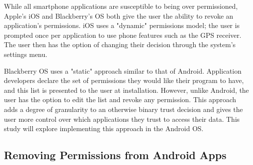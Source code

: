 While all smartphone applications are susceptible to being over permissioned, Apple's iOS and Blackberry's OS both give the user the ability to revoke an application’s permissions.  iOS uses a "dynamic" permissions model; the user is prompted once per application to use phone features such as the GPS receiver.  The user then has the option of changing their decision through the system's settings menu.  

Blackberry OS uses a "static" approach similar to that of Android.  Application developers declare the set of permissions they would like their program to have, and this list is presented to the user at installation.  However, unlike Android, the user has the option to edit the list and revoke any permission.  This approach adds a degree of granularity to an otherwise binary trust decision and gives the user more control over which applications they trust to access their data.  This study will explore implementing this approach in the Android OS.  

\subsection{Removing Permissions from Android Apps}


